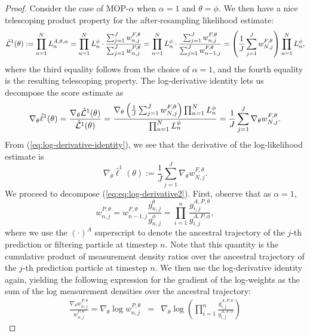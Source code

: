 \begin{proof}
    Consider the case of MOP-$\alpha$ when $\alpha=1$ and $\theta=\phi$. We then have a nice telescoping product property for the after-resampling likelihood estimate:
\begin{equation}
    \hat{\mathcal{L}}^1(\theta) := \prod_{n=1}^N L_n^{A, \theta, \alpha} = \prod_{n=1}^N L_n^\phi \cdot \frac{\sum_{j=1}^J w_{n,j}^{F,\theta}}{\sum_{j=1}^J w_{n,j}^{P,\theta}}= \prod_{n=1}^N L_n^\phi \cdot \frac{\sum_{j=1}^J w_{n,j}^{F,\theta}}{\sum_{j=1}^J w_{n-1,j}^{F,\theta}} = \left(\frac{1}{J}\sum_{j=1}^J w_{N,j}^{F,\theta}\right) \prod_{n=1}^N L_n^\phi,
\end{equation}
where the third equality follows from the choice of $\alpha=1$, and the fourth equality is the resulting telescoping property. 
The log-derivative identity lets us decompose the score estimate as
\begin{equation}\label{eq:log-derivative-identity}
\nabla_\theta \hat\ell^1(\theta) = \frac{\nabla_\theta \hat{\mathcal{L}}^1(\theta)}{\hat{\mathcal{L}}^1(\theta)} = \frac{\nabla_\theta\left(\frac{1}{J}\sum_{j=1}^J w_{N,j}^{F,\theta}\right) \prod_{n=1}^N L_n^\phi}{\prod_{n=1}^N L_n^\phi} =  \frac{1}{J}\sum_{j=1}^J \nabla_\theta w_{N,j}^{F,\theta}.
\end{equation}
From (\ref{eq:log-derivative-identity}), we see that the derivative of the log-likelihood estimate is
\begin{equation}\label{eq:eq:log-derivative2}
    \nabla_\theta \hat{\ell}^1(\theta) := \frac{1}{J}\sum_{j=1}^J \nabla_\theta w_{N,j}^{F,\theta}.
\end{equation}
We proceed to decompose (\ref{eq:eq:log-derivative2}).
First, observe that as $\alpha=1$,
\begin{equation}
w_{n,j}^{P,\theta} = w_{n-1,j}^{F,\theta}\frac{g_{n,j}^\theta}{g_{n,j}^\phi} = \prod_{i=1}^n \frac{g_{i,j}^{A,P,\theta}}{g_{i,j}^{A,P,\phi}},
\end{equation}
where we use the $(\cdot)^A$ superscript to denote the ancestral trajectory of the $j$-th prediction or filtering particle at timestep $n$. 
Note that this quantity is the cumulative product of measurement density ratios over the ancestral trajectory of the $j$-th prediction particle at timestep $n$.
We then use the log-derivative identity again, yielding the following expression for the gradient of the log-weights as the sum of the log measurement densities over the ancestral trajectory:
\begin{eqnarray}
 \frac{\nabla_\theta w_{n,j}^{P,\theta}}{w_{n,j}^{P,\theta}} = \nabla_\theta \log w_{n,j}^{P,\theta} &=& \nabla_\theta \log \left(\prod_{i=1}^n \frac{g_{i,j}^{A,P,\theta}}{g_{i,j}^{A,P,\phi}}\right) 

\end{eqnarray}
\end{proof}
